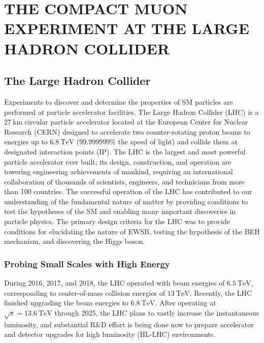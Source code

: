 
\chapter{THE COMPACT MUON EXPERIMENT AT THE LARGE HADRON COLLIDER}
\label{The_CMS_Experiment_at_the_LHC}

\section{The Large Hadron Collider}
Experiments to discover and determine the properties of SM particles are performed at particle accelerator facilities.
The Large Hadron Collider (LHC) is a $\SI{27}{\km}$ circular particle accelerator located at the European Center for Nuclear Research (CERN) designed to accelerate two counter-rotating proton beams to energies up to $\SI{6.8}{\TeV}$ ($99.999999\%$ the speed of light) and collide them at designated interaction points (IP).
The LHC is the largest and most powerful particle accelerator ever built; its design, construction, and operation are towering engineering achievements of mankind, requiring an international collaboration of thousands of scientists, engineers, and technicians from more than 100 countries.
The successful operation of the LHC has contributed to our understanding of the fundamental nature of matter by providing conditions to test the hypotheses of the SM and enabling many important discoveries in particle physics.
The primary design criteria for the LHC was to provide conditions for elucidating the nature of EWSB, testing the hypothesis of the BEH mechanism, and discovering the Higgs boson.

\subsection{Probing Small Scales with High Energy}
During 2016, 2017, and 2018, the LHC operated with beam energies of $\SI{6.5}{\TeV}$, corresponding to center-of-mass collision energies of $\SI{13}{\TeV}$.
Recently, the LHC finished upgrading the beam energies to $\SI{6.8}{\TeV}$.
After operating at $\sqrt{s}=\SI{13.6}{\TeV}$ through 2025, the LHC plans to vastly increase the instantaneous luminosity, and substantial R\&D effort is being done now to prepare accelerator and detector upgrades for high luminosity (HL-LHC) environments.

